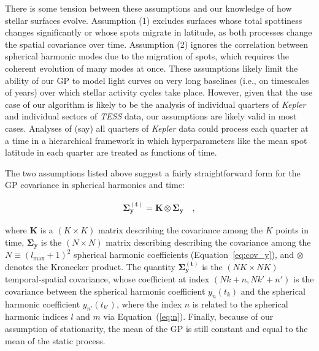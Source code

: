 \documentclass[modern,linenumbers]{aastex62}
\begin{document}
There is some tension between these assumptions and our knowledge of how stellar
surfaces evolve. Assumption (1) excludes surfaces whose total spottiness changes
significantly
or whose spots migrate in latitude, as both processes change the spatial covariance
over time. Assumption (2) ignores the correlation between spherical harmonic modes
due to the migration of spots, which requires the coherent evolution of many
modes at once. These assumptions likely limit the ability of our GP to model
light curves on very long baselines (i.e., on timescales of years) over which
stellar activity cycles take place. However, given that the use case of our
algorithm is likely to be the analysis of individual quarters of \emph{Kepler}
and individual sectors of \emph{TESS} data,
our assumptions are likely valid in most cases. Analyses of (say) all quarters of
\emph{Kepler} data could process each quarter at a time in a hierarchical
framework in which hyperparameters like the mean spot latitude in each quarter
are treated as functions of time.

The two assumptions listed above suggest a fairly straightforward form for the
GP covariance in spherical harmonics and time:
%
\begin{linenomath}\begin{align}
        \label{eq:Sigmaty}
        \pmb{\Sigma}_\mathbf{y}^\mathbf{(t)} = \mathbf{K} \otimes \pmb{\Sigma}_\mathbf{y}
        \quad,
    \end{align}\end{linenomath}
%
where $\mathbf{K}$ is a $(K \times K)$ matrix describing the
covariance among the $K$ points in time,
$\pmb{\Sigma}_\mathbf{y}$ is the $(N \times N)$ matrix describing describing
the covariance among the $N \equiv (l_\mathrm{max} + 1)^2$ spherical
harmonic coefficients (Equation~\ref{eq:cov_y}),
and $\otimes$ denotes the Kronecker product.
The quantity $\pmb{\Sigma}_\mathbf{y}^\mathbf{(t)}$
is the $(NK \times NK)$ temporal-spatial covariance, whose coefficient at index
$(Nk + n, Nk' + n')$ is the covariance between the spherical harmonic coefficient
$y_{n}(t_k)$ and the spherical harmonic coefficient $y_{n'}(t_{k'})$, where
the index $n$ is related to the spherical harmonic indices $l$ and $m$ via
Equation~(\ref{eq:n}). Finally, because of our assumption of stationarity,
the mean of the GP is still constant and equal to the mean of the static
process.
\end{document}
